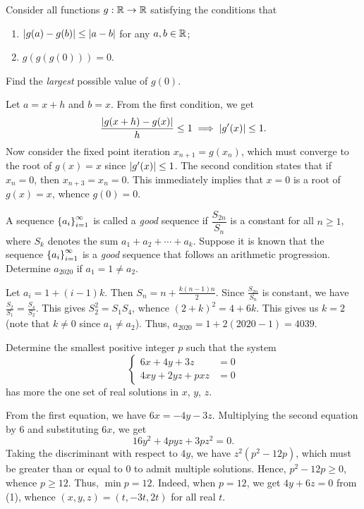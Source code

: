 \begin{question}[0]\label{A::2020-O-1-14}
    Consider all functions $g : \mathbb{R} \to \mathbb{R}$ satisfying the conditions that
    \begin{enumerate}
    \item $\left\lvert g(a) - g(b) \right\rvert \leq \left\lvert a - b \right\rvert$ for any $a, b \in \mathbb{R}$;
    \item $g(g(g(0))) = 0$.
    \end{enumerate}
    Find the \textit{largest} possible value of $g(0)$.
\end{question}
\begin{solution*}
    Let $a = x+h$ and $b = x$. From the first condition, we get \[\frac{\left\lvert g(x+h) - g(x) \right\rvert}{h} \leq 1 \implies \left\lvert g'(x) \right\rvert \leq 1.\] Now consider the fixed point iteration $x_{n+1} = g(x_n)$, which must converge to the root of $g(x) = x$ since $\left\lvert g'(x) \right\rvert \leq 1$. The second condition states that if $x_n = 0$, then $x_{n+3} = x_n = 0$. This immediately implies that $x = 0$ is a root of $g(x) = x$, whence $g(0) = 0$.
\end{solution*}

\begin{question}[4039]\label{A::2020-O-1-15}
    A sequence $\left\lbrace a_i \right\rbrace_{i=1}^\infty$ is called a \textit{good} sequence if $\dfrac{S_{2n}}{S_n}$ is a constant for all $n \geq 1$, where $S_k$ denotes the sum $a_1 + a_2 + \cdots + a_k$. Suppose it is known that the sequence $\left\lbrace a_i \right\rbrace_{i = 1}^\infty$ is a \textit{good} sequence that follows an arithmetic progression. Determine $a_{2020}$ if $a_1 = 1 \neq a_2$.
\end{question}
\begin{solution*}
    Let $a_i = 1 + (i-1)k$. Then $S_n = n + \frac{k(n-1)n}{2}$. Since $\frac{S_{2n}}{S_n}$ is constant, we have $\frac{S_2}{S_1} = \frac{S_4}{S_2}$. This gives $S_2^2 = S_1 S_4$, whence $(2+k)^2 = 4 + 6k$. This gives us $k = 2$ (note that $k \neq 0$ since $a_1 \neq a_2$). Thus, $a_{2020} = 1 + 2(2020-1) = 4039$.
\end{solution*}

\clearpage
\begin{question}[12]\label{A::2020-O-1-16}
    Determine the smallest positive integer $p$ such that the system \[\left\{
    \begin{aligned}
        6x + 4y + 3z &= 0\\
        4xy + 2yz + pxz &= 0
    \end{aligned}\right.\] has more the one set of real solutions in $x$, $y$, $z$.
\end{question}
\begin{solution*}
    From the first equation, we have $6x = -4y - 3z$. Multiplying the second equation by 6 and substituting $6x$, we get \[16y^2 + 4pyz + 3pz^2 = 0. \tag{1}\] Taking the discriminant with respect to $4y$, we have $z^2(p^2 - 12p)$, which must be greater than or equal to 0 to admit multiple solutions. Hence, $p^2 - 12p \geq 0$, whence $p \geq 12$. Thus, $\min p = 12$. Indeed, when $p = 12$, we get $4y + 6z = 0$ from (1), whence $(x, y, z) = (t, -3t, 2t)$ for all real $t$.
\end{solution*}

